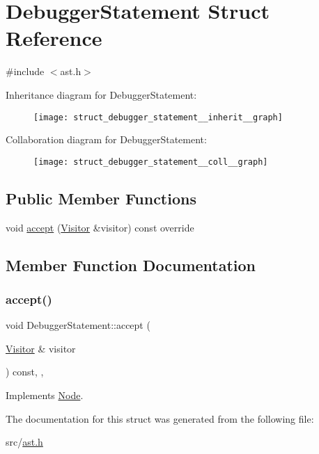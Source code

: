 \hypertarget{struct_debugger_statement}{}\section{Debugger\+Statement Struct Reference}
\label{struct_debugger_statement}


{\ttfamily \#include $<$ast.\+h$>$}



Inheritance diagram for Debugger\+Statement\+:
\nopagebreak
\begin{figure}[H]
\begin{center}
\leavevmode
\texttt{[image: struct\_debugger\_statement\_\_inherit\_\_graph]}
\end{center}
\end{figure}


Collaboration diagram for Debugger\+Statement\+:
\nopagebreak
\begin{figure}[H]
\begin{center}
\leavevmode
\texttt{[image: struct\_debugger\_statement\_\_coll\_\_graph]}
\end{center}
\end{figure}
\subsection*{Public Member Functions}
\begin{DoxyCompactItemize}
\item 
void \hyperlink{struct_debugger_statement_adb69027b0b27e1a8f74f4ddea5957799}{accept} (\hyperlink{struct_visitor}{Visitor} \&visitor) const override
\end{DoxyCompactItemize}


\subsection{Member Function Documentation}
\mbox{\label{struct_debugger_statement_adb69027b0b27e1a8f74f4ddea5957799}} 
\subsubsection{\texorpdfstring{accept()}{accept()}}
{\footnotesize\ttfamily void Debugger\+Statement\+::accept (\begin{DoxyParamCaption}\item[{\hyperlink{struct_visitor}{Visitor} \&}]{visitor }\end{DoxyParamCaption}) const\hspace{0.3cm}{\ttfamily [inline]}, {\ttfamily [override]}, {\ttfamily [virtual]}}



Implements \hyperlink{struct_node_a10bd7af968140bbf5fa461298a969c71}{Node}.



The documentation for this struct was generated from the following file\+:\begin{DoxyCompactItemize}
\item 
src/\hyperlink{ast_8h}{ast.\+h}\end{DoxyCompactItemize}
